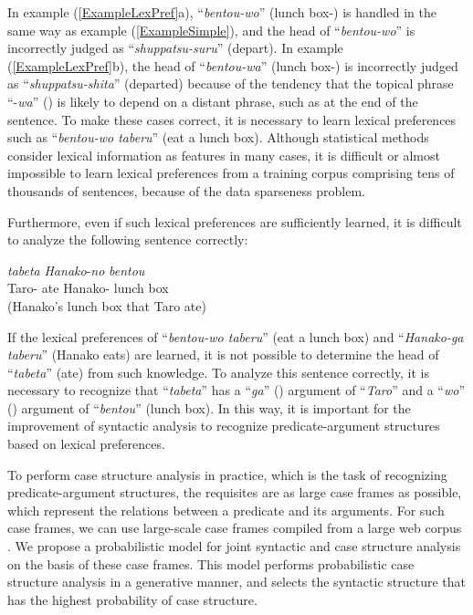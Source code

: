 \documentclass[english]{jnlp_1.4_rep}
\newcommand{\nom}{}
\newcommand{\acc}{}
\newcommand{\gen}{}
\newcommand{\TOP}{}
\begin{document}
In example (\ref{ExampleLexPref}a), ``\textit{bentou-wo}'' (lunch
box-\acc) is handled in the same
way as example (\ref{ExampleSimple}), and the head of ``\textit{bentou-wo}'' is
incorrectly judged as ``\textit{shuppatsu-suru}'' (depart). In example (\ref{ExampleLexPref}b),
the head of ``\textit{bentou-wa}'' (lunch box-\TOP) is incorrectly
judged as ``\textit{shuppatsu-shita}'' (departed) because of the
tendency that the topical phrase ``-\textit{wa}'' (\TOP) is likely to depend on a
distant phrase, such as at the end of the sentence. To make these cases
correct, it is necessary to learn lexical preferences such as
``\textit{bentou-wo taberu}'' (eat a lunch box). Although statistical methods consider lexical information as
features in many cases, it is difficult or almost impossible to learn
lexical preferences from a training corpus comprising tens of
thousands of sentences, because of the data sparseness problem.

Furthermore, even if such lexical preferences are sufficiently learned,
it is difficult to analyze the following sentence correctly:

\begin{exe}
\ex \label{ExampleDifficult}
  {\textit{tabeta}} {\textit{Hanako}-\textit{no}} {\textit{bentou}} \\
      {Taro-\nom} {ate} {Hanako-\gen} {lunch box}\\
 \trans (Hanako's lunch box that Taro ate)
\end{exe}

If the lexical preferences of ``\textit{bentou-wo taberu}'' (eat a lunch box) and ``\textit{Hanako-ga taberu}'' (Hanako eats)
are learned, it is not possible to determine the head of ``\textit{tabeta}'' (ate) from
such knowledge. To analyze this sentence correctly, it is necessary to
recognize that ``\textit{tabeta}'' has a ``\textit{ga}'' (\nom) argument of ``\textit{Taro}'' and a ``\textit{wo}'' (\acc)
argument of ``\textit{bentou}'' (lunch box). In this way, it is important for the improvement
of syntactic analysis to recognize predicate-argument structures based
on lexical preferences.

To perform case structure analysis in practice, which is the task of
recognizing predicate-argument structures, the requisites are as large
case frames as possible, which represent the relations between a
predicate and its arguments. For such case frames, we can use
large-scale case frames compiled from a large web corpus
\cite{Kawahara2006}. We propose a probabilistic model for joint
syntactic and case structure analysis on the basis of these case
frames. This model performs probabilistic case structure analysis in a
generative manner, and selects the syntactic structure that has the
highest probability of case structure.
\end{document}
